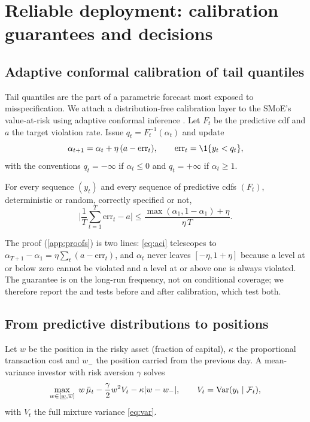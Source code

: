 \section{Reliable deployment: calibration guarantees and decisions}\label{sec:deployment}

\subsection{Adaptive conformal calibration of tail quantiles}

Tail quantiles are the part of a parametric forecast most exposed to misspecification. We attach a
distribution-free calibration layer to the SMoE's value-at-risk using adaptive conformal inference
\citep{gibbs2021adaptive}. Let $F_t$ be the predictive cdf and $a$ the target violation rate. Issue
$q_t=F_t^{-1}(\alpha_t)$ and update
\begin{equation}\label{eq:aci}
  \alpha_{t+1}=\alpha_t+\eta\,(a-\mathrm{err}_t),\qquad \mathrm{err}_t=\1\{y_t<q_t\},
\end{equation}
with the conventions $q_t=-\infty$ if $\alpha_t\le0$ and $q_t=+\infty$ if $\alpha_t\ge1$.

\begin{theorem}\label{thm:aci}
For every sequence $(y_t)$ and every sequence of predictive cdfs $(F_t)$, deterministic or random,
correctly specified or not,
\begin{equation}
  \Big|\frac1T\sum_{t=1}^T\mathrm{err}_t-a\Big|\le\frac{\max(\alpha_1,1-\alpha_1)+\eta}{\eta\,T}.
\end{equation}
\end{theorem}

\noindent The proof (\cref{app:proofs}) is two lines: \eqref{eq:aci} telescopes to
$\alpha_{T+1}-\alpha_1=\eta\sum_t(a-\mathrm{err}_t)$, and $\alpha_t$ never leaves
$[-\eta,1+\eta]$ because a level at or below zero cannot be violated and a level at or above one is
always violated. The guarantee is on the long-run frequency, not on conditional coverage; we
therefore report the \citet{kupiec1995techniques} and \citet{christoffersen1998evaluating} tests before
and after calibration, which test both.

\subsection{From predictive distributions to positions}\label{sec:decision}

Let $w$ be the position in the risky asset (fraction of capital), $\kappa$ the proportional
transaction cost and $w_-$ the position carried from the previous day. A mean-variance investor with
risk aversion $\gamma$ solves
\begin{equation}\label{eq:mv}
  \max_{w\in[\underline w,\overline w]}\;w\,\bar\mu_t-\frac{\gamma}{2}w^2 V_t-\kappa|w-w_-|,
  \qquad V_t=\operatorname{Var}(y_t\mid\mathcal{F}_t),
\end{equation}
with $V_t$ the full mixture variance \eqref{eq:var}.


